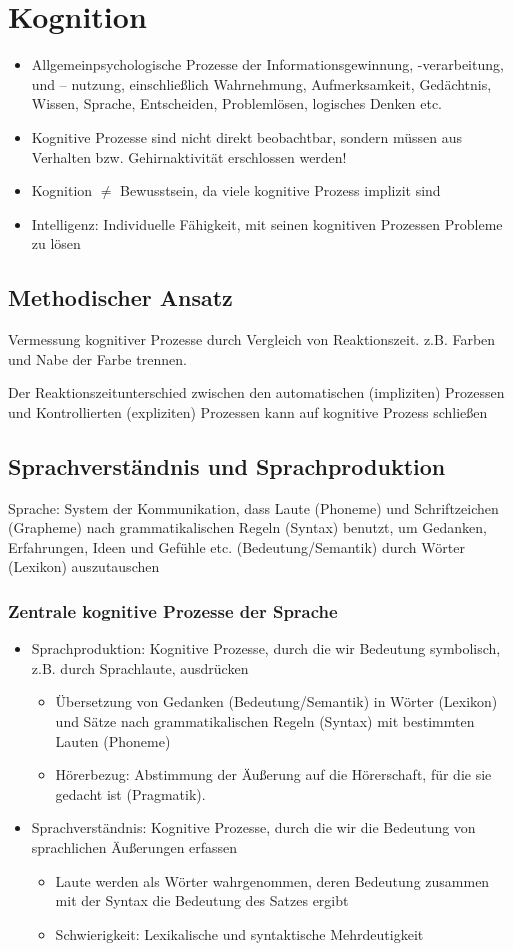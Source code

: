 \section{Kognition}
\begin{itemize}
	\item Allgemeinpsychologische Prozesse der Informationsgewinnung, -verarbeitung, und – nutzung, einschließlich Wahrnehmung, Aufmerksamkeit, Gedächtnis, Wissen, Sprache, Entscheiden, Problemlösen, logisches Denken etc.
	\item Kognitive Prozesse sind nicht direkt beobachtbar, sondern müssen aus Verhalten bzw. Gehirnaktivität erschlossen werden!
	\item Kognition $\not=$ Bewusstsein, da viele kognitive Prozess implizit sind
	\item Intelligenz: Individuelle Fähigkeit, mit seinen kognitiven Prozessen Probleme zu lösen  
\end{itemize}
\subsection{Methodischer Ansatz}
Vermessung kognitiver Prozesse durch Vergleich von Reaktionszeit. z.B. Farben und Nabe der Farbe trennen.

Der Reaktionszeitunterschied zwischen den automatischen (impliziten) Prozessen und Kontrollierten (expliziten) Prozessen kann auf kognitive Prozess schließen
\subsection{Sprachverständnis und Sprachproduktion}
Sprache: System der Kommunikation, dass Laute (Phoneme) und Schriftzeichen (Grapheme) nach grammatikalischen Regeln (Syntax) benutzt, um Gedanken, Erfahrungen, Ideen und Gefühle etc. (Bedeutung/Semantik) durch Wörter (Lexikon) auszutauschen
\subsubsection{Zentrale kognitive Prozesse der Sprache}
\begin{itemize}
	\item Sprachproduktion: Kognitive Prozesse, durch die wir Bedeutung symbolisch, z.B. durch Sprachlaute, ausdrücken
		\begin{itemize}
			\item Übersetzung von Gedanken (Bedeutung/Semantik) in Wörter (Lexikon) und Sätze nach grammatikalischen Regeln (Syntax) mit bestimmten Lauten (Phoneme)
			\item Hörerbezug: Abstimmung der Äußerung auf die Hörerschaft, für die sie gedacht ist (Pragmatik).
		\end{itemize}
	\item Sprachverständnis: Kognitive Prozesse, durch die wir die Bedeutung von sprachlichen Äußerungen erfassen
		\begin{itemize}
			\item Laute werden als Wörter wahrgenommen, deren Bedeutung zusammen mit der Syntax die Bedeutung des Satzes ergibt
			\item Schwierigkeit: Lexikalische und syntaktische Mehrdeutigkeit
		\end{itemize}
\end{itemize}
